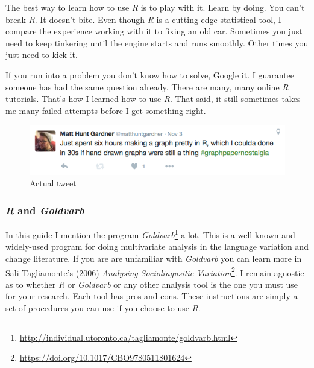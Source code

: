\documentclass[
  10pt,
  letterpaper]{article}
\DeclareRobustCommand{\href}[2]{#2\footnote{\url{#1}}}
\begin{document}
\begin{tcolorbox}[enhanced jigsaw, coltitle=black, colframe=quarto-callout-note-color-frame, leftrule=.75mm, bottomtitle=1mm, arc=.35mm, opacitybacktitle=0.6, title=\textcolor{quarto-callout-note-color}{\faInfo}\hspace{0.5em}{Note}, colbacktitle=quarto-callout-note-color!10!white, breakable, left=2mm, titlerule=0mm, colback=white, toptitle=1mm, rightrule=.15mm, bottomrule=.15mm, toprule=.15mm, opacityback=0]
The best way to learn how to use \emph{R} is to play with it. Learn by
doing. You can't break \emph{R}. It doesn't bite. Even though \emph{R}
is a cutting edge statistical tool, I compare the experience working
with it to fixing an old car. Sometimes you just need to keep tinkering
until the engine starts and runs smoothly. Other times you just need to
kick it.
\end{tcolorbox}

If you run into a problem you don't know how to solve, Google it. I
guarantee someone has had the same question already. There are many,
many online \emph{R} tutorials. That's how I learned how to use
\emph{R}. That said, it still sometimes takes me many failed attempts
before I get something right.

\begin{figure}

{\centering \includegraphics{images/tweet.png}

}

\caption{\label{fig-tweet}Actual tweet}

\end{figure}

\hypertarget{r-and-goldvarb}{%
\subsubsection{\texorpdfstring{\emph{R} and
\emph{Goldvarb}}{R and Goldvarb}}\label{r-and-goldvarb}}

In this guide I mention the program
\href{http://individual.utoronto.ca/tagliamonte/goldvarb.html}{\emph{Goldvarb}}
a lot. This is a well-known and widely-used program for doing
multivariate analysis in the language variation and change literature.
If you are are unfamiliar with \emph{Goldvarb} you can learn more in
Sali Tagliamonte's (2006)
\href{https://doi.org/10.1017/CBO9780511801624}{\emph{Analysing
Sociolingusitic Variation}}. I remain agnostic as to whether \emph{R} or
\emph{Goldvarb} or any other analysis tool is the one you must use for
your research. Each tool has pros and cons. These instructions are
simply a set of procedures you can use if you choose to use \emph{R}.
\end{document}
